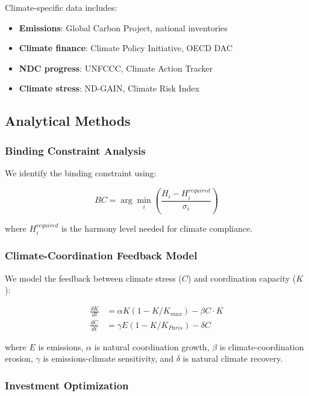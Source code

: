 \documentclass[12pt,a4paper]{article}
\begin{document}
Climate-specific data includes:

\begin{itemize}
    \item \textbf{Emissions}: Global Carbon Project, national inventories
    \item \textbf{Climate finance}: Climate Policy Initiative, OECD DAC
    \item \textbf{NDC progress}: UNFCCC, Climate Action Tracker
    \item \textbf{Climate stress}: ND-GAIN, Climate Risk Index
\end{itemize}

\subsection{Analytical Methods}

\subsubsection{Binding Constraint Analysis}

We identify the binding constraint using:

\begin{equation}
BC = \arg\min_i \left( \frac{H_i - H_i^{required}}{\sigma_i} \right)
\end{equation}

where $H_i^{required}$ is the harmony level needed for climate compliance.

\subsubsection{Climate-Coordination Feedback Model}

We model the feedback between climate stress ($C$) and coordination capacity ($K$):

\begin{align}
\frac{dK}{dt} &= \alpha K(1 - K/K_{max}) - \beta C \cdot K \\
\frac{dC}{dt} &= \gamma E(1 - K/K_{Paris}) - \delta C
\end{align}

where $E$ is emissions, $\alpha$ is natural coordination growth, $\beta$ is climate-coordination erosion, $\gamma$ is emissions-climate sensitivity, and $\delta$ is natural climate recovery.

\subsubsection{Investment Optimization}
\end{document}
